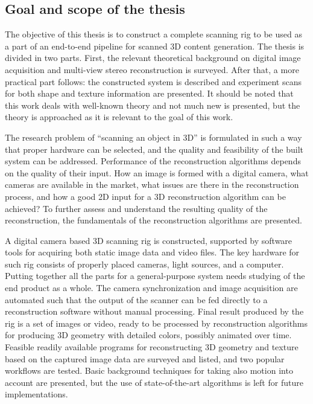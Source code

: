\subsection{Goal and scope of the thesis}

The objective of this thesis is to construct a complete scanning rig to be used as a part of an end-to-end pipeline for scanned 3D content generation.
The thesis is divided in two parts.
First, the relevant theoretical background on digital image acquisition and multi-view stereo reconstruction is surveyed.
After that, a more practical part follows: the constructed system is described and experiment scans for both shape and texture information are presented.
It should be noted that this work deals with well-known theory and not much new is presented, but the theory is approached as it is relevant to the goal of this work.

The research problem of ``scanning an object in 3D'' is formulated in such a way that proper hardware can be selected, and the quality and feasibility of the built system can be addressed.
Performance of the reconstruction algorithms depends on the quality of their input.
How an image is formed with a digital camera, what cameras are available in the market, what issues are there in the reconstruction process, and how a good 2D input for a 3D reconstruction algorithm can be achieved?
To further assess and understand the resulting quality of the reconstruction, the fundamentals of the reconstruction algorithms are presented.

A digital camera based 3D scanning rig is constructed, supported by software tools for acquiring both static image data and video files.
The key hardware for such rig consists of properly placed cameras, light sources, and a computer.
Putting together all the parts for a general-purpose system needs studying of the end product as a whole.
The camera synchronization and image acquisition are automated such that the output of the scanner can be fed directly to a reconstruction software without manual processing.
Final result produced by the rig is a set of images or video, ready to be processed by reconstruction algorithms for producing 3D geometry with detailed colors, possibly animated over time.
Feasible readily available programs for reconstructing 3D geometry and texture based on the captured image data are surveyed and listed, and two popular workflows are tested.
Basic background techniques for taking also motion into account are presented, but the use of state-of-the-art algorithms is left for future implementations.

